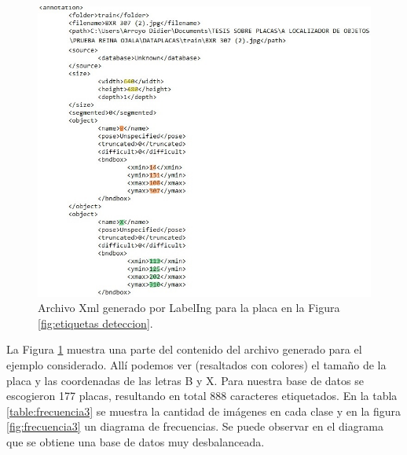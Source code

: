 \begin{figure}[H]
\centering
\includegraphics[width=0.7\linewidth]{imagenes/RESULTADOS/annonations.jpg} \caption{Archivo Xml generado por LabelIng para la placa en la Figura \ref{fig:etiquetas deteccion}.}
\label{fig:Ejemplo anotación Xml}
\end{figure}
 
 
 La Figura \ref{fig:Ejemplo anotación Xml} muestra una parte del contenido del archivo generado para el ejemplo considerado. Allí podemos ver (resaltados con colores) el tamaño de la placa y las coordenadas de las letras B y X.
Para nuestra base de datos se escogieron 177 placas, resultando en total 888 caracteres etiquetados. En la tabla \ref{table:frecuencia3} se muestra la cantidad de imágenes en cada clase y en la figura \ref{fig:frecuencia3} un diagrama de frecuencias. Se puede observar en el diagrama que se obtiene una base de datos muy desbalanceada.

